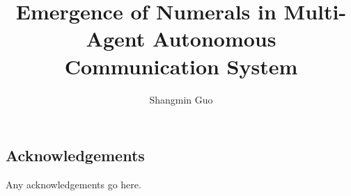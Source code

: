 \documentclass[msc,deptreport,datasci]{infthesis}
\begin{document}
\begin{preliminary}

\title{Emergence of Numerals in Multi-Agent Autonomous Communication System}

\author{Shangmin Guo}



\maketitle

\section*{Acknowledgements}
Any acknowledgements go here. 

\tableofcontents
\end{preliminary}











% 
% 
% 
\end{document}
